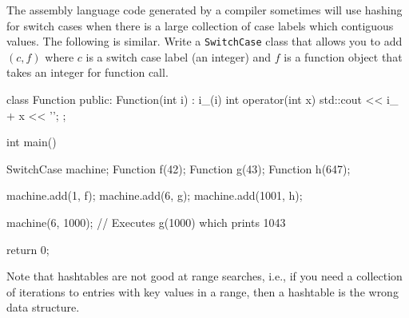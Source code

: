 \begin{ex}
The assembly language code generated by a compiler sometimes will use
hashing for switch cases when there is a large collection of
case labels which contiguous values.
The following is similar.
Write a \verb!SwitchCase! class that allows you to add
$(c, f)$ where $c$ is a switch case label (an integer) and
$f$ is a function object that takes an integer for
function call.
\begin{console}
class Function
{
public:
    Function(int i) : i_(i) {}
    int operator(int x) { std::cout << i_ + x << '\n'; }
};

int main()
{
    SwitchCase machine;
    Function f(42);
    Function g(43);
    Function h(647);
    
    machine.add(1, f);
    machine.add(6, g);
    machine.add(1001, h);

    machine(6, 1000); // Executes g(1000) which prints 1043
    
    return 0;
}
\end{console}
\end{ex}
  
Note that hashtables are not good at range searches, i.e.,
if you need a collection of iterations to entries with key
values in a range, then a hashtable is the wrong data structure.

\newpage{}
